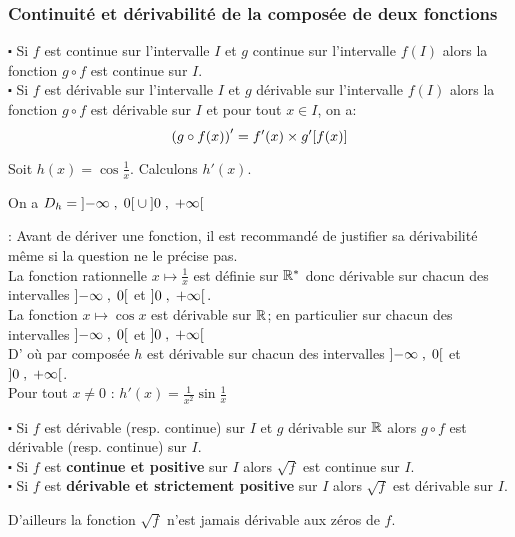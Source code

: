 \begin{example}
\subsubsection*{Continuité et dérivabilité de la composée de deux fonctions}
\begin{property}
$ \centerdot $ Si $ f $ est continue sur l'intervalle $ I $ et $ g $ continue sur l'intervalle $ f(I) $ alors la fonction $ g\circ f $ est continue sur  $ I $.\\
$ \centerdot $ Si $ f $ est dérivable sur l'intervalle $ I $ et $ g $ dérivable sur l'intervalle $ f(I) $ alors la fonction $ g\circ f $ est dérivable sur $ I $ et pour tout $ x\in I $, on a:
\[\left(g\circ f(x)\right)'= f'(x)\times g'[f(x)] \]
\end{property}
\begin{example} 
Soit $h(x)= \cos \frac{1}{x}$. Calculons  $h'(x) $.

On a   $D_{h}= \left]-\infty \;,\; 0\right[\cup \left]0 \;,\; +\infty\right[ $

\textbf{\color{red}{Attention}}:  Avant de dériver une fonction, il est recommandé de justifier sa dérivabilité même si la question ne le précise pas.\\
La fonction rationnelle $ x\mapsto \frac{1}{x} $ est  définie sur $ \mathbb{R}^* $ donc dérivable sur chacun des intervalles $\left]-\infty \;,\; 0\right[ $ et $\left]0 \;,\; +\infty\right[. $\\
La fonction $ x\mapsto \cos x $ est dérivable sur $ \mathbb{R} $; en particulier sur chacun des intervalles $\left]-\infty \;,\; 0\right[ $ et $\left]0 \;,\; +\infty\right[ $\\ D' où par  composée $ h $ est dérivable  sur chacun des intervalles $\left]-\infty \;,\; 0\right[ $ et $\left]0 \;,\; +\infty\right[ $.\\
Pour tout   $ x\neq 0 $  \quad :    $h'(x)=\frac{1}{x^{2}}\sin \frac{1}{x} $ 

\end{example}
\begin{corollary}
$ \centerdot $ Si $ f $ est dérivable  (resp. continue) sur $ I $  et $ g $ dérivable sur $ \mathbb{R} $  alors $ g \circ f $ est dérivable (resp. continue) sur $ I. $\\
$ \centerdot $ Si $ f $ est \textbf{\color{magenta} continue et positive} sur $ I $ alors $ \sqrt{f} $ est continue sur $ I $.\\
$ \centerdot $ Si $ f $ est \textbf{\color{magenta} dérivable et strictement positive } sur $ I $ alors $ \sqrt{f} $ est dérivable sur $ I $.
\end{corollary}
\colorbox{yellow!60!}{ D'ailleurs la fonction $ \sqrt{f} $ n'est jamais dérivable aux zéros de $ f. $}


\end{example}
